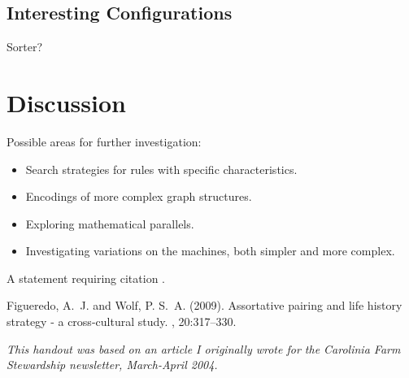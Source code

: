 \documentclass{tufte-handout}
\begin{document}
\subsection{Interesting Configurations}
Sorter?


\section{Discussion}

Possible areas for further investigation:

\begin{itemize}
    \item Search strategies for rules with specific characteristics.
    \item Encodings of more complex graph structures.
    \item Exploring mathematical parallels.
    \item Investigating variations on the machines, both simpler and more complex.
\end{itemize}

A statement requiring citation \cite{Figueredo:2009dg}.


\begin{thebibliography}{99} %

Figueredo, A.~J. and Wolf, P. S.~A. (2009).
\newblock Assortative pairing and life history strategy - a cross-cultural
  study.
, 20:317--330.
 
\end{thebibliography}

\vspace{1cm}

\emph{This handout was based on an article I originally wrote for the Carolinia Farm Stewardship newsletter, March-April 2004.}
\end{document}
